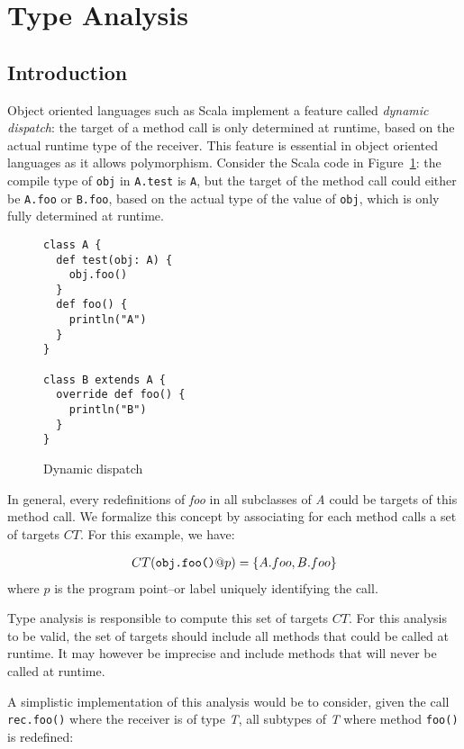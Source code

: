 \section{Type Analysis}

\subsection{Introduction}
Object oriented languages such as Scala implement a feature called
\emph{dynamic dispatch}: the target of a method call is only determined at
runtime, based on the actual runtime type of the receiver. This feature is
essential in object oriented languages as it allows polymorphism. Consider the
Scala code in Figure~\ref{fig:ta:example1}: the compile type of \verb/obj/ in
\verb/A.test/ is \verb/A/, but the target of the method call could either be
\verb/A.foo/ or \verb/B.foo/, based on the actual type of the value of
\verb/obj/, which is only fully determined at runtime.

\begin{figure}[h]
    \centering
\begin{lstlisting}
class A {
  def test(obj: A) {
    obj.foo()
  }
  def foo() {
    println("A")
  }
}

class B extends A {
  override def foo() {
    println("B")
  }
}
\end{lstlisting}
    \caption{Dynamic dispatch}
    \label{fig:ta:example1}
\end{figure}

In general, every redefinitions of \emph{foo} in all subclasses of \emph{A}
could be targets of this method call. We formalize this concept by associating
for each method calls a set of targets $CT$. For this example, we have:

\begin{eqnarray*}
    CT(\verb/obj.foo()/@p) = \{A.foo, B.foo\}
\end{eqnarray*}
where $p$ is the program point--or label uniquely identifying the call.

Type analysis is responsible to compute this set of targets $CT$. For this
analysis to be valid, the set of targets should include all methods that could
be called at runtime. It may however be imprecise and include methods that will
never be called at runtime.

A simplistic implementation of this analysis would be to consider, given
the call \verb/rec.foo()/ where the receiver is of type \emph{T}, all subtypes
of \emph{T} where method \verb/foo()/ is redefined:

